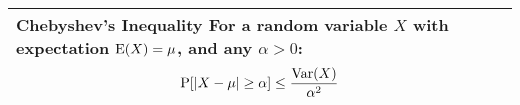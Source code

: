 \tabulinesep=1mm
\begin{tabu}{|p{16cm} |}
\hline
\vspace{2 mm}
\textbf{Chebyshev's Inequality } \newline
For a random variable $X$ with expectation  $\text{E}(X) = \mu$, and any  
$\alpha > 0$:
\[\text{P}[|X - \mu | \geq \alpha] \leq \frac{\text{Var}(X)}{\alpha^2}\]
\\
\hline
\end{tabu}
